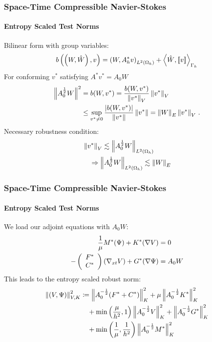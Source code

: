 \documentclass[18pt,xcolor=table]{beamer}
\begin{document}
\begin{frame}[t]
\frametitle{Space-Time Compressible Navier-Stokes}
\framesubtitle{Entropy Scaled Test Norms}  %
Bilinear form with group variables:
\[
b\left( \left( W,\hat W \right),v \right) = \left( W,A^*_h v \right)_{L^2\left( \Omega_h \right)} + \left\langle \hat W, \left[ \![v]\! \right] \right\rangle_{\Gamma_h}
\]
For conforming $v^*$ satisfying $A^* v^* = A_0W$
\begin{align*}
\left\| A_0^\frac{1}{2}W \right\|^2
&=b(W,v^*)
=\frac{b(W,v^*)}{\left\| v^* \right\|_V} \left\| v^* \right\|_V\\
&\leq\sup_{v^*\neq0}\frac{|b(W,v^*)|}{\left\| v^* \right\|}\left\| v^* \right\|
=\left\| W \right\|_E \left\| v^* \right\|_V\,.
\end{align*}
Necessary robustness condition:
\begin{align*}
&\left\| v^* \right\|_V\lesssim\left\| A_0^\frac{1}{2}W \right\|_{L^2(\Omega_h)}\\
&\quad\Rightarrow\left\| A_0^\frac{1}{2}W \right\|_{L^2(\Omega_h)}\lesssim\left\| W \right\|_E
\end{align*}
\end{frame}


\begin{frame}[t]
\frametitle{Space-Time Compressible Navier-Stokes}
\framesubtitle{Entropy Scaled Test Norms}  %
We load our adjoint equations with $A_0W$:
\begin{align*}
\frac{1}{\mu}M^*(\Psi)+K^*(\nabla V)&=0
\\
-\left( \begin{array}{c} F^*\\ C^*\\ \end{array} \right)(\nabla_{xt} V)+G^*(\nabla\Psi)&=A_0W
\end{align*}
This leads to the entropy scaled robust norm:
\begin{align*}
\left\| \left( V,\Psi \right) \right\|_{V,K}^2 &\coloneqq
\left\| A_0^{-\frac{1}{2}}(F^*+C^*) \right\|_K^2
+ \mu\left\| A_0^{-\frac{1}{2}}K^* \right\|_K^2
\\\nonumber&\quad
+ \min\left( \frac{\mu}{h^2},1 \right)\left\| A_0^{-\frac{1}{2}}V \right\|^2_K
+ \left\| A_0^{-\frac{1}{2}}G^* \right\|_K^2
\\\nonumber&\quad
+ \min\left( \frac{1}{\mu},\frac{1}{h^2} \right)\left\| A_0^{-\frac{1}{2}}M^* \right\|_K^2
\end{align*}
\end{frame}
\end{document}
